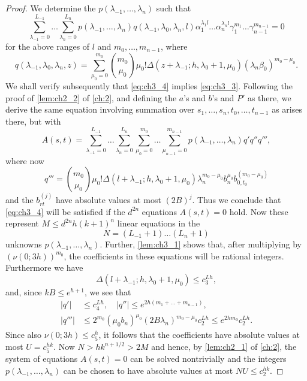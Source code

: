 \begin{proof}
We determine the $p(\lambda_{-1}, \dots, \lambda_n)$ such that
\begin{equation} \label{eq:ch3_4}\tag{4}
\sum_{\lambda_{-1}=0}^{L_{-1}} \dots \sum_{\lambda_n=0}^{L_n} p(\lambda_{-1}, \dots, \lambda_n) q(\lambda_{-1}, \lambda_0, \lambda_n, l) \alpha_1^{\lambda_1 l} \dots \alpha_n^{\lambda_n l} \gamma_1^{m_1} \dots \gamma_{n-1}^{m_{n-1}} = 0
\end{equation}
for the above ranges of $l$ and $m_0, \dots, m_{n-1}$, where
\[
q(\lambda_{-1}, \lambda_0, \lambda_n, z) = \sum_{\mu_0=0}^{m_0} \binom{m_0}{\mu_0} \mu_0! \Delta(z + \lambda_{-1}; h, \lambda_0 + 1, \mu_0) (\lambda_n \beta_0)^{m_0 - \mu_0}.
\]
We shall verify subsequently that \eqref{eq:ch3_4} implies \eqref{eq:ch3_3}. Following the proof of \autoref{lem:ch2_2} of \autoref{ch:2}, and defining the $a$'s and $b$'s and $P'$ as there, we derive the same equation involving summation over $s_1, \dots, s_n, t_0, \dots, t_{n-1}$ as arises there, but with
\[
A(s,t) = \sum_{\lambda_{-1}=0}^{L_{-1}} \dots \sum_{\lambda_n=0}^{L_n} \sum_{\mu_0=0}^{m_0} \dots \sum_{\mu_{n-1}=0}^{m_{n-1}} p(\lambda_{-1}, \dots, \lambda_n) q' q'' q''',
\]
where now
\[
q''' = \binom{m_0}{\mu_0} \mu_0! \Delta(l+\lambda_{-1}; h, \lambda_0+1, \mu_0) \lambda_n^{m_0-\mu_0} b_n^{\mu_0} b_{0, t_0}^{(m_0-\mu_0)}
\]
and the $b_{rt}^{(j)}$ have absolute values at most $(2B)^j$. Thus we conclude that \eqref{eq:ch3_4} will be satisfied if the $d^{2n}$ equations $A(s,t)=0$ hold. Now these represent $M \le d^{2n}h(k+1)^n$ linear equations in the
\[
N = (L_{-1} + 1) \dots (L_n + 1)
\]
unknowns $p(\lambda_{-1}, \dots, \lambda_n)$. Further, \autoref{lem:ch3_1} shows that, after multiplying by $(\nu(0; 3h))^{m_0}$, the coefficients in these equations will be rational integers. Furthermore we have
\[
\Delta(l+\lambda_{-1}; h, \lambda_0+1, \mu_0) \le c_3^{Lh},
\]
and, since $kB \le e^{h+1}$, we see that
\begin{align*}
|q'| &\le c_4^{Lh}, \quad |q''| \le e^{2h(m_1 + \dots + m_{n-1})}, \\
|q'''| &\le 2^{m_0} (\mu_0 b_n)^{\mu_0} (2B\lambda_n)^{m_0 - \mu_0} c_2^{Lh} \le e^{2hm_0} c_2^{Lh}.
\end{align*}
Since also $\nu(0;3h) \le c_5^h$, it follows that the coefficients have absolute values at most $U = c_5^{hk}$. Now $N > hk^{n+1/2} > 2M$ and hence, by \autoref{lem:ch2_1} of \autoref{ch:2}, the system of equations $A(s,t)=0$ can be solved nontrivially and the integers $p(\lambda_{-1}, \dots, \lambda_n)$ can be chosen to have absolute values at most $NU \le c_2^{hk}$.


\end{proof}

